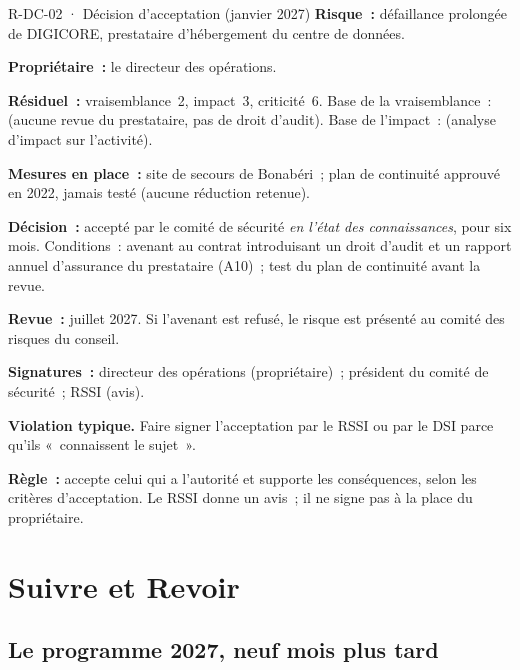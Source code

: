 \begin{boxobjet}{R-DC-02 · Décision d'acceptation (janvier 2027)}
\textbf{Risque~:} défaillance prolongée de DIGICORE, prestataire
d'hébergement du centre de données.

\textbf{Propriétaire~:} le directeur des opérations.

\textbf{Résiduel~:} vraisemblance~2, impact~3, criticité~6. Base de la
vraisemblance~: \NEK{} (aucune revue du prestataire, pas de droit
d'audit). Base de l'impact~: \OUI{} (analyse d'impact sur l'activité).

\textbf{Mesures en place~:} site de secours de Bonabéri~; plan de
continuité approuvé en 2022, jamais testé (aucune réduction retenue).

\textbf{Décision~:} accepté par le comité de sécurité \emph{en l'état des
connaissances}, pour six mois. Conditions~: avenant au contrat introduisant
un droit d'audit et un rapport annuel d'assurance du prestataire (A10)~;
test du plan de continuité avant la revue.

\textbf{Revue~:} juillet 2027. Si l'avenant est refusé, le risque est
présenté au comité des risques du conseil.

\textbf{Signatures~:} directeur des opérations (propriétaire)~; président
du comité de sécurité~; RSSI (avis).
\end{boxobjet}

\begin{boxalert}
\textbf{Violation typique.} Faire signer l'acceptation par le RSSI ou par
le DSI parce qu'ils «~connaissent le sujet~».

\smallskip
\textbf{Règle~:} accepte celui qui a l'autorité et supporte les
conséquences, selon les critères d'acceptation. Le RSSI donne un avis~; il
ne signe pas à la place du propriétaire.
\end{boxalert}

\section{Suivre et Revoir}
\label{sec:c03-suivre}

\subsection{Le programme 2027, neuf mois plus tard}

